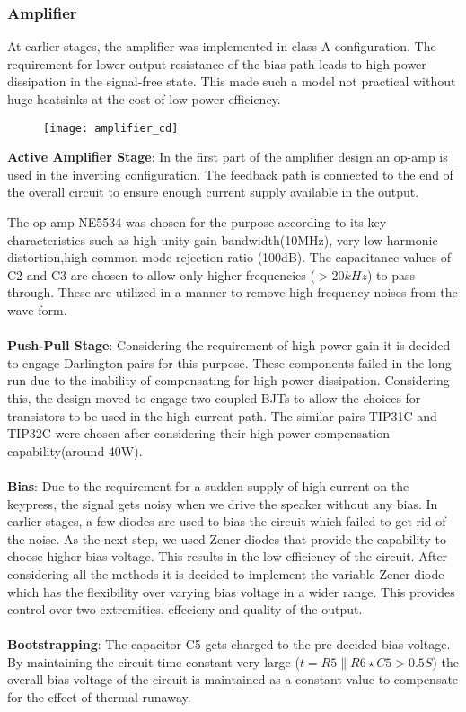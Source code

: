 \documentclass[class=article,crop=false,11pt]{standalone}
\begin{document}
\subsubsection{Amplifier}
At earlier stages, the amplifier was implemented in class-A configuration. The requirement for lower output resistance of the bias path leads to high power dissipation in the signal-free state. This made such a model not practical without huge heatsinks at the cost of low power efficiency.
\begin{figure}
    \begin{center}
        \texttt{[image: amplifier\_cd]}
    \end{center}
\end{figure}
\textbf{Active Amplifier Stage}: In the first part of the amplifier design an op-amp is used in the inverting configuration. The feedback path is connected to the end of the overall circuit to ensure enough current supply available in the output. 
\par 
The op-amp NE5534 was chosen for the purpose according to its key characteristics such as high unity-gain bandwidth(10MHz), very low harmonic distortion,high common mode rejection ratio (100dB). The capacitance values of C2 and C3 are chosen to allow only higher frequencies ($>20kHz$) to pass through. These are utilized in a manner to remove high-frequency noises from the wave-form.
\\
\\
\textbf{Push-Pull Stage}: Considering the requirement of high power gain it is decided to engage Darlington pairs for this purpose. These components failed in the long run due to the inability of compensating for high power dissipation. Considering this, the design moved to engage two coupled BJTs to allow the choices for transistors to be used in the high current path. The similar pairs TIP31C and TIP32C were chosen after considering their high power compensation capability(around 40W).
\\
\\
\textbf{Bias}: Due to the requirement for a sudden supply of high current on the keypress, the signal gets noisy when we drive the speaker without any bias. In earlier stages, a few diodes are used to bias the circuit which failed to get rid of the noise. As the next step, we used Zener diodes that provide the capability to choose higher bias voltage. This results in the low efficiency of the circuit.
After considering all the methods it is decided to implement the variable Zener diode which has the flexibility over varying bias voltage in a wider range. This provides control over two extremities, effecieny and quality of the output.
\\
\\
\textbf{Bootstrapping}: The capacitor C5 gets charged to the pre-decided bias voltage.  By maintaining the circuit time constant very large ($t=R5\parallel R6\star C5>0.5S$) the overall bias voltage of the circuit is maintained as a constant value to compensate for the effect of thermal runaway.
\end{document}
